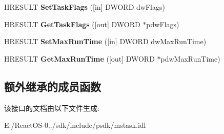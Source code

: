 \begin{DoxyCompactItemize}
\mbox{\label{interface_i_task_af7cac0febf47e29fa1437f3aa6a790d5}} 
H\+R\+E\+S\+U\+LT {\bfseries Set\+Task\+Flags} (\mbox{[}in\mbox{]} D\+W\+O\+RD dw\+Flags)
\item 
\mbox{\label{interface_i_task_a78f31f324df2e90f6614d34cc6684645}} 
H\+R\+E\+S\+U\+LT {\bfseries Get\+Task\+Flags} (\mbox{[}out\mbox{]} D\+W\+O\+RD $\ast$pdw\+Flags)
\item 
\mbox{\label{interface_i_task_ad9de5565a1c503a66a77e4e39d2b6bc6}} 
H\+R\+E\+S\+U\+LT {\bfseries Set\+Max\+Run\+Time} (\mbox{[}in\mbox{]} D\+W\+O\+RD dw\+Max\+Run\+Time)
\item 
\mbox{\label{interface_i_task_a29894379cc5d6ab3ead5bed9bb363a51}} 
H\+R\+E\+S\+U\+LT {\bfseries Get\+Max\+Run\+Time} (\mbox{[}out\mbox{]} D\+W\+O\+RD $\ast$pdw\+Max\+Run\+Time)
\end{DoxyCompactItemize}
\subsection*{额外继承的成员函数}


该接口的文档由以下文件生成\+:\begin{DoxyCompactItemize}
\item 
E\+:/\+React\+O\+S-\/0../sdk/include/psdk/mstask.\+idl\end{DoxyCompactItemize}
